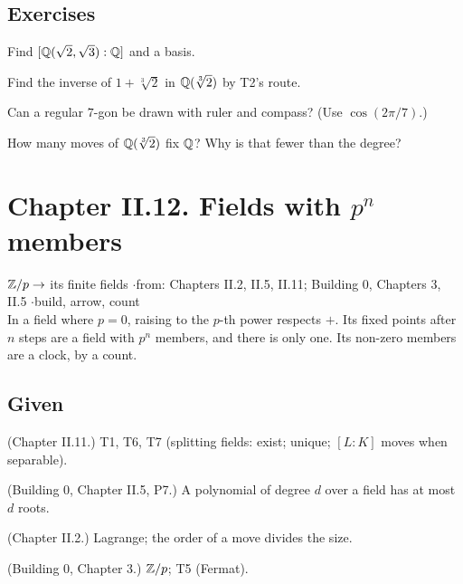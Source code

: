\subsection*{Exercises}

\begin{lines}
\item[\lab{E1}] Find $[\mathbb{Q}(\sqrt2, \sqrt3) : \mathbb{Q}]$ and a basis.
\item[\lab{E2}] Find the inverse of $1 + \sqrt[3]{2}$ in $\mathbb{Q}(\sqrt[3]{2})$ by T2's route.
\item[\lab{E3}] Can a regular $7$-gon be drawn with ruler and compass? (Use $\cos(2\pi/7)$.)
\item[\lab{E4}] How many moves of $\mathbb{Q}(\sqrt[3]{2})$ fix $\mathbb{Q}$? Why is that fewer than the degree?
\end{lines}

\newpage

\section*{Chapter II.12. Fields with $p^n$ members}
\begin{center}
{\normalsize $\mathbb{Z}/p \to$ its finite fields \quad$\cdot$\quad from: Chapters II.2, II.5, II.11; Building 0, Chapters 3, II.5 \quad$\cdot$\quad build, arrow, count}\\[4pt]
{\small In a field where $p = 0$, raising to the $p$-th power respects $+$. Its fixed points after $n$ steps are a field with $p^n$ members, and there is only one. Its non-zero members are a clock, by a count.}
\end{center}

\subsection*{Given}

\begin{lines}
\item[\lab{G1}] (Chapter II.11.) T1, T6, T7 (splitting fields: exist; unique; $[L : K]$ moves when separable).
\item[\lab{G2}] (Building 0, Chapter II.5, P7.) A polynomial of degree $d$ over a field has at most $d$ roots.
\item[\lab{G3}] (Chapter II.2.) Lagrange; the order of a move divides the size.
\item[\lab{G4}] (Building 0, Chapter 3.) $\mathbb{Z}/p$; T5 (Fermat).
\end{lines}

